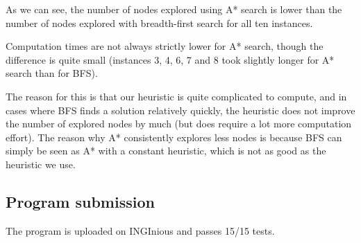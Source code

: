\documentclass[journal]{IEEEtran}
\begin{document}
As we can see, the number of nodes explored using A* search is lower than the number of nodes explored with breadth-first search for all ten instances.

Computation times are not always strictly lower for A* search, though the difference is quite small (instances 3, 4, 6, 7 and 8 took slightly longer for A* search than for BFS).

The reason for this is that our heuristic is quite complicated to compute, and in cases where BFS finds a solution relatively quickly, the heuristic does not improve the number of explored nodes by much (but does require a lot more computation effort).
The reason why A* consistently explores less nodes is because BFS can simply be seen as A* with a constant heuristic, which is not as good as the heuristic we use.

\subsection{Program submission}
The program is uploaded on INGInious and passes 15/15 tests.
\end{document}
